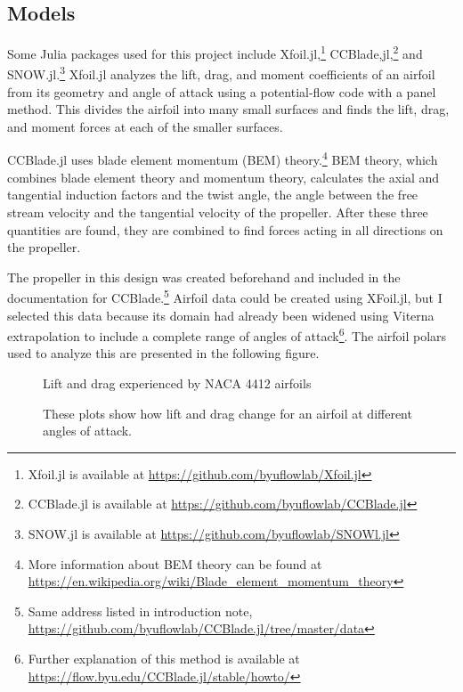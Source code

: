 \documentclass[journal ]{new-aiaa}
\begin{document}
\subsection{Models}

Some Julia packages used for this project include Xfoil.jl,\footnote{Xfoil.jl is available at \url{https://github.com/byuflowlab/Xfoil.jl}} CCBlade,jl,\footnote{CCBlade.jl is available at \url{https://github.com/byuflowlab/CCBlade.jl}} and SNOW.jl.\footnote{SNOW.jl is available at \url{https://github.com/byuflowlab/SNOWl.jl}} Xfoil.jl analyzes the lift, drag, and moment coefficients of an airfoil from its geometry and angle of attack using a potential-flow code with a panel method. This divides the airfoil into many small surfaces and finds the lift, drag, and moment forces at each of the smaller surfaces. 

CCBlade.jl uses blade element momentum (BEM) theory.\footnote{More information about BEM theory can be found at \url{https://en.wikipedia.org/wiki/Blade_element_momentum_theory}} BEM theory, which combines blade element theory and momentum theory, calculates the axial and tangential induction factors and the twist angle, the angle between the free stream velocity and the tangential velocity of the propeller. After these three quantities are found, they are combined to find forces acting in all directions on the propeller\cite{CCBlade}.

The propeller in this design was created beforehand and included in the documentation for CCBlade.\footnote{Same address listed in introduction note, \url{https://github.com/byuflowlab/CCBlade.jl/tree/master/data}} Airfoil data could be created using XFoil.jl, but I selected this data because its domain had already been widened using Viterna extrapolation to include a complete range of angles of attack\footnote{Further explanation of this method is available at \url{https://flow.byu.edu/CCBlade.jl/stable/howto/}}. The airfoil polars used to analyze this are presented in the following figure. 

\begin{figure}[H]
\centering
	\caption{Lift and drag experienced by NACA 4412 airfoils}
	\captionsetup{aboveskip=0pt,font=it}
	\caption*{These plots show how lift and drag change for an airfoil at different angles of attack.}
	\label{afplot}
\end{figure}
\end{document}
